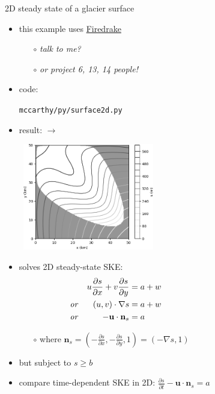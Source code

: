 \documentclass[10pt,dvipsnames]{beamer}
\newcommand{\bn}{\mathbf{n}}
\newcommand{\bu}{\mathbf{u}}
\newcommand{\grad}{\nabla}
\begin{document}
\begin{frame}{2D steady state of a glacier surface}

\begin{itemize}
\item this example uses \href{https://www.firedrakeproject.org/}{Firedrake}
{\footnotesize
    \begin{itemize}
    \item[$\circ$] \emph{talk to me?}
    \item[$\circ$] \emph{or project 6, 13, 14 people!}
    \end{itemize}
}
\item code:

{\small \texttt{mccarthy/py/surface2d.py}}

\item result: $\rightarrow$

\vspace{-25mm}
\mbox{\hspace{60mm} \includegraphics[width=0.45\textwidth]{surface2d}}

\vspace{-12mm}
\item solves 2D steady-state SKE:
\begin{align*}
&& u \frac{\partial s}{\partial x} + v \frac{\partial s}{\partial y} &= a + w \hspace{40mm}\\
\text{\emph{or}} && (u,v) \cdot \grad s &= a + w \\
\text{\emph{or}} && -\bu \cdot \bn_s &= a
\end{align*}

{\footnotesize
    \begin{itemize}
    \item[$\circ$] where $\bn_s = (-\frac{\partial s}{\partial x},-\frac{\partial s}{\partial y},1) = (-\grad s,1)$
    \end{itemize}
}

\smallskip
\item \alert{but subject to $s \ge b$}

\medskip
\item compare time-dependent SKE in 2D: \quad $\displaystyle \frac{\partial s}{\partial t} - \bu \cdot \bn_s = a$
\end{itemize}
\end{frame}
\end{document}
